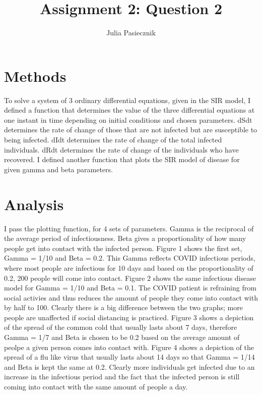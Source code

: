 \documentclass[apj]{emulateapj}
\begin{document}
\title{Assignment 2: Question 2}
 
\author{Julia Pasiecznik}

\section{Methods}
\label{sec:Methods}
To solve a system of 3 ordinary differential equations, given in the SIR model, I defined a function that determines the value of the three differential equations at one instant in time depending on initial conditions and chosen parameters. dSdt determines the rate of change of those that are not infected but are susceptible to being infected. dIdt determines the rate of change of the total infected individuals. dRdt determines the rate of change of the individuals who have recovered. I defined another function that plots the SIR model of disease for given gamma and beta parameters.

\section{Analysis}
\label{sec:Analysis}
I pass the plotting function, for 4 sets of parameters. Gamma is the reciprocal of the average period of infectiousness. Beta gives a proportionality of how many people get into contact with the infected person. Figure 1 shows the first set, Gamma = 1/10 and Beta = 0.2. This Gamma reflects COVID infectious periods, where most people are infectious for 10 days and based on the proportionality of 0.2, 200 people will come into contact. Figure 2 shows the same infectious disease model for Gamma = 1/10 and Beta = 0.1. The COVID patient is refraining from social activies and thus reduces the amount of people they come into contact with by half to 100. Clearly there is a big difference between the two graphs; more people are unaffected if social distancing is practiced. Figure 3 shows a depiction of the spread of the common cold that usually lasts about 7 days, therefore Gamma = 1/7 and Beta is chosen to be 0.2 based on the average amount of peolpe a given person comes into contact with. Figure 4 shows a depiction of the spread of a flu like virus that usually lasts about 14 days so that Gamma = 1/14 and Beta is kept the same at 0.2. Clearly more individuals get infected due to an increase in the infectious period and the fact that the infected person is still coming into contact with the same amount of people a day.
\end{document}
